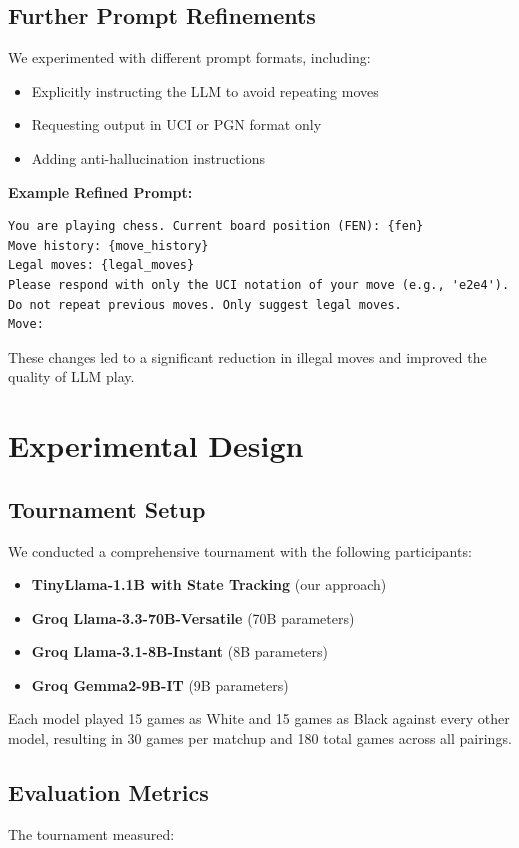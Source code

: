 \documentclass[11pt,a4paper]{report}
\begin{document}
\subsection{Further Prompt Refinements}
We experimented with different prompt formats, including:
\begin{itemize}
    \item Explicitly instructing the LLM to avoid repeating moves
    \item Requesting output in UCI or PGN format only
    \item Adding anti-hallucination instructions
\end{itemize}

\textbf{Example Refined Prompt:}
\begin{lstlisting}[style=Python]
You are playing chess. Current board position (FEN): {fen}
Move history: {move_history}
Legal moves: {legal_moves}
Please respond with only the UCI notation of your move (e.g., 'e2e4'). Do not repeat previous moves. Only suggest legal moves.
Move:
\end{lstlisting}

These changes led to a significant reduction in illegal moves and improved the quality of LLM play.

\section{Experimental Design}

\subsection{Tournament Setup}
We conducted a comprehensive tournament with the following participants:

\begin{itemize}
    \item \textbf{TinyLlama-1.1B with State Tracking} (our approach)
    \item \textbf{Groq Llama-3.3-70B-Versatile} (70B parameters)
    \item \textbf{Groq Llama-3.1-8B-Instant} (8B parameters)
    \item \textbf{Groq Gemma2-9B-IT} (9B parameters)
\end{itemize}

Each model played 15 games as White and 15 games as Black against every other model, resulting in 30 games per matchup and 180 total games across all pairings.

\subsection{Evaluation Metrics}
The tournament measured:
\end{document}
